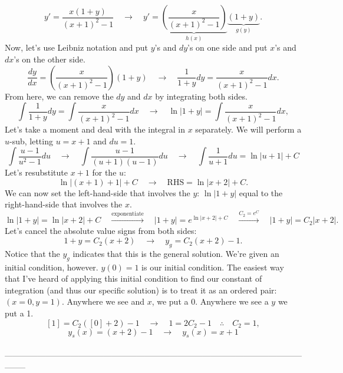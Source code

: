 \documentclass[a4paper,12pt]{article} %
\begin{document}
$$ y' = \frac{x(1+y)}{(x+1)^2 - 1} \quad\rightarrow\quad y' = \underbrace{\left(\frac{x}{(x+1)^2-1}\right)}_{h(x)}\underbrace{\left(1+y\right)}_{g(y)}.
$$
Now, let's use Leibniz notation and put $y$'s and $dy$'s on one side and put $x$'s and $dx$'s on the other side.
$$ \frac{dy}{dx} = \left(\frac{x}{(x+1)^2-1}\right){\left(1+y\right)} \quad\rightarrow\quad \frac{1}{1 + y}dy = \frac{x}{(x+1)^2-1}dx. $$
From here, we can remove the $dy$ and $dx$ by integrating both sides.
$$ \int \frac{1}{1 + y}dy = \int \frac{x}{(x+1)^2-1}dx \quad\rightarrow\quad \ln{|1 + y|} = \int \frac{x}{(x+1)^2-1}dx, $$
Let's take a moment and deal with the integral in $x$ separately. We will perform a $u$-sub, letting $u=x+1$ and $du = 1$.
$$ \int \frac{u - 1}{u^2 - 1}du \quad\rightarrow\quad \int \frac{u-1}{(u+1)(u-1)}du \quad\rightarrow\quad  \int \frac{1}{u+1}du = \ln{|u+1|} + C $$
Let's resubstitute $x+1$ for the $u$:
$$ \ln{|(x + 1) + 1|} + C \quad\rightarrow\quad \text{RHS} = \ln{|x + 2|} + C. $$
We can now set the left-hand-side that involves the $y$: $\ln{|1 + y|}$ equal to the right-hand-side that involves the $x$.
$$ \ln{|1 + y|} = \ln{|x + 2|} + C \quad\overset{\text{exponentiate}}\rightarrow\quad |1 + y| = e^{\ln{|x+2|} + C} \quad\overset{C_2=e^{C}}\rightarrow\quad |1+y| = C_2|x+2|.$$
Let's cancel the absolute value signs from both sides:
$$ 1 + y = C_2(x + 2) \quad\rightarrow\quad y_g = C_2(x + 2) - 1. $$
Notice that the $y_g$ indicates that this is the general solution. We're given an initial condition, however. $y(0)=1$ is our initial condition. The easiest way that I've heard of applying this initial condition to find our constant of integration (and thus our specific solution) is to treat it as an ordered pair: $(x=0, y=1)$. Anywhere we see and $x$, we put a 0. Anywhere we see a $y$ we put a 1.\\

$$[1] = C_2([0] + 2) - 1 \quad\rightarrow\quad 1 = 2C_2 - 1 \quad\therefore\quad C_2 = 1,$$
$$ y_s(x) = (x + 2)-1 \quad\rightarrow\quad \boxed{y_s(x) = x + 1} $$
\\
--------------------------------------------------------------------------------------------------------------------

\pagebreak
\end{document}
